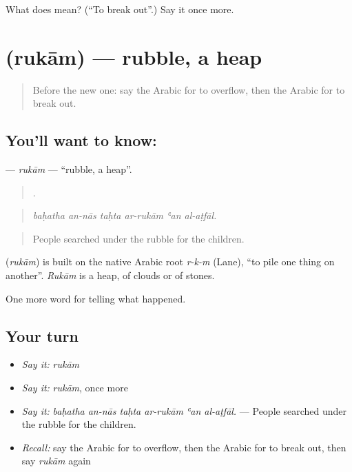 \begin{tcolorbox}[breakable,colback=teal!4,colframe=teal!35!black,title={Before you move on}]
What does  mean? (\textquotedblleft{}To break out\textquotedblright{}.) Say it once more.
\end{tcolorbox}
\section[\texorpdfstring{\ar{ركام} (rukām)}{ركام (rukām)}]{ (rukām) — rubble, a heap}

\label{lesson:AR-C316-rukam}



\begin{quote}
Before the new one: say the Arabic for to overflow, then the Arabic for to break out.
\end{quote}

\subsection*{You'll want to know: }
\textbf{} — \emph{rukām} — \textquotedblleft{}rubble, a heap\textquotedblright{}.

\begin{quote}
     .
\end{quote}

\begin{quote}
\emph{baḥatha an-nās taḥta ar-rukām ʿan al-aṭfāl.}
\end{quote}

\begin{quote}
People searched under the rubble for the children.
\end{quote}

\begin{cousinweb}
\textbf{} (\emph{rukām}) is built on the native Arabic root \emph{r-k-m} (Lane), \textquotedblleft{}to pile one thing on another\textquotedblright{}. \emph{Rukām} is a heap, of clouds or of stones.
\end{cousinweb}

\begin{grammarlens}[title={What you've built}]
One more word for telling what happened.
\end{grammarlens}

\subsection*{Your turn}
\begin{itemize}
\raggedright
  \item \emph{Say it:} \emph{rukām}
  \item \emph{Say it:} \emph{rukām}, once more
  \item \emph{Say it:} \emph{baḥatha an-nās taḥta ar-rukām ʿan al-aṭfāl.} — People searched under the rubble for the children.
  \item \emph{Recall:} say the Arabic for to overflow, then the Arabic for to break out, then say \emph{rukām} again
\end{itemize}

